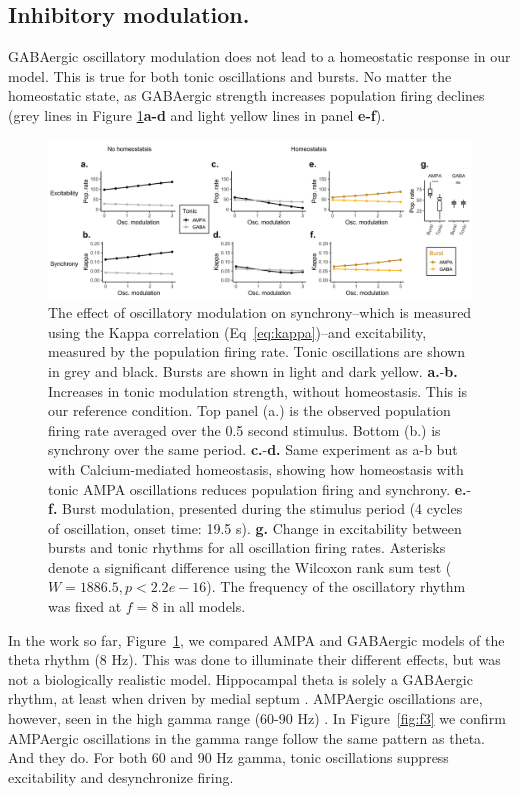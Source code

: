\documentclass{article}
\begin{document}
\subsection*{Inhibitory modulation.}
GABAergic oscillatory modulation does not lead to a homeostatic response in our model. This is true for both tonic oscillations and bursts. No matter the homeostatic state, as GABAergic strength increases population firing declines (grey lines in Figure \ref{fig:f2}\textbf{a-d} and light yellow lines in panel \textbf{e-f}).

\begin{figure}
\centering
\includegraphics[width=1\textwidth]{fig2.png}
\caption{\label{fig:f2}
    The effect of oscillatory modulation on synchrony--which is measured using the Kappa correlation (Eq~\ref{eq:kappa})--and excitability, measured by the population firing rate. Tonic oscillations are shown in grey and black. Bursts are shown in light and dark yellow.
    \textbf{a.}-\textbf{b.} Increases in tonic modulation strength, without homeostasis. This is our reference condition. Top panel (a.) is the observed population firing rate averaged over the 0.5 second stimulus. Bottom (b.) is synchrony over the same period.
    \textbf{c.}-\textbf{d.} Same experiment as a-b but with Calcium-mediated homeostasis, showing how homeostasis with tonic AMPA oscillations reduces population firing and synchrony.
    \textbf{e.}-\textbf{f.} Burst modulation, presented during the stimulus period (4 cycles of oscillation, onset time: 19.5 s).
    \textbf{g.} Change in excitability between bursts and tonic rhythms for all oscillation firing rates. Asterisks denote a significant difference using the Wilcoxon rank sum test ($W = 1886.5, p < 2.2e-16$). The frequency of the oscillatory rhythm was fixed at $f = 8$ in all models.}
\end{figure}

In the work so far, Figure~\ref{fig:f2}, we compared AMPA and GABAergic models of the theta rhythm (8 Hz). This was done to illuminate their different effects, but was not a biologically realistic model. Hippocampal theta is solely a GABAergic rhythm, at least when driven by medial septum \cite{Colgin2016a}. AMPAergic oscillations are, however, seen in the high gamma range (60-90 Hz) \cite{Csicsvari2003,Colgin2016,}. In Figure~\ref{fig:f3} we confirm AMPAergic oscillations in the gamma range follow the same pattern as theta. And they do. For both 60 and 90 Hz gamma, tonic oscillations suppress excitability and desynchronize firing. 
\end{document}
